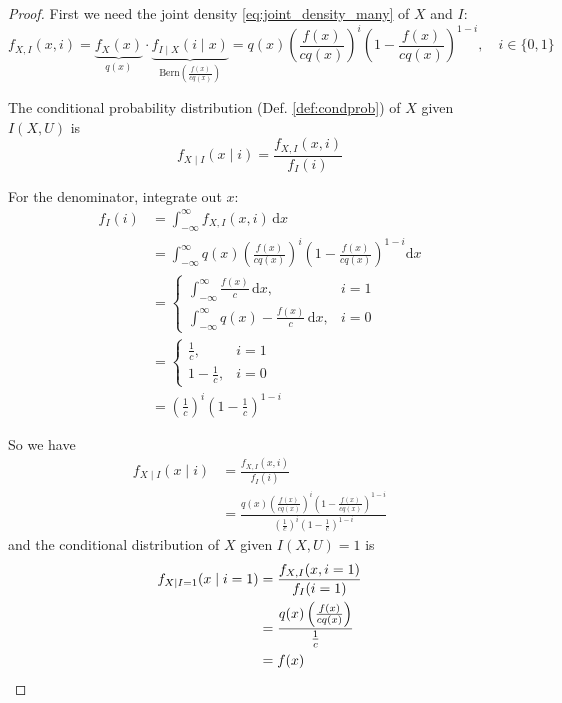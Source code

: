 \documentclass[10pt, headings=standardclasses, parskip=half, twoside]{scrartcl}
\newcommand{\dif}{\mathrm{d}}
\begin{document}
\begin{proof}
  First we need the joint density \eqref{eq:joint_density_many} of \(X\) and \(I\):
  \[
    f_{X,I}(x, i)
    = \underbrace{f_X(x)}_{q(x)} \cdot \underbrace{f_{I \mid X}(i \mid  x)}_{\text{Bern}\left(\frac{f(x)}{c q(x)}\right)} 
    = q(x) \left( \frac{f(x)}{c q(x)} \right)^i \left( 1 - \frac{f(x)}{c q(x)} \right)^{1-i}, \quad i \in \{0, 1\}
  \]
  
  The conditional probability distribution (Def. \ref{def:condprob}) of $X$ given $I(X,U)$ is
  \[
  f_{X \mid I}(x \mid i) = \frac{f_{X,I}(x, i)}{f_I(i)}
  \]
  
  For the denominator, integrate out $x$:
  \begin{align*}
  f_I(i) &= \int_{-\infty}^{\infty} f_{X,I}(x, i) \, \dif x \\
  &= \int_{-\infty}^{\infty} q(x) \left( \frac{f(x)}{c q(x)} \right)^i \left( 1 - \frac{f(x)}{c q(x)} \right)^{1-i} \dif x \\
  &= 
  \begin{cases}
  \int_{-\infty}^{\infty} \frac{f(x)}{c} \, \dif x, & i = 1 \\
  \int_{-\infty}^{\infty} q(x) - \frac{f(x)}{c} \, \dif x, & i = 0
  \end{cases} \\
  &= 
  \begin{cases}
  \frac{1}{c}, & i = 1 \\
  1 - \frac{1}{c}, & i = 0
  \end{cases} \\
  &= \left( \frac{1}{c} \right)^i \left( 1 - \frac{1}{c} \right)^{1-i}
  \end{align*}
  
  So we have
  \begin{align*}
    f_{X \mid I}(x \mid i) &= \frac{f_{X,I}(x, i)}{f_I(i)} \\
    &= \frac{q(x) \left( \frac{f(x)}{c q(x)} \right)^i \left( 1 - \frac{f(x)}{c q(x)} \right)^{1-i}}{\left( \frac{1}{c} \right)^i \left( 1 - \frac{1}{c} \right)^{1-i}}
  \end{align*}
  and the conditional distribution of $X$ given $I(X,U) = 1$ is
  \begin{align*}
  f_{X \mid I=1}(x \mid i = 1) &= \frac{f_{X,I}(x, i=1)}{f_I(i=1)} \\
  &= \frac{q(x) \left( \frac{f(x)}{c q(x)} \right)}{\frac{1}{c}} \\
  &= f(x) \qedhere
  \end{align*}
\end{proof}
\end{document}

